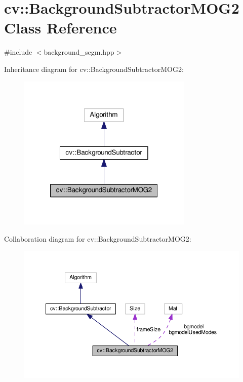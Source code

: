 \hypertarget{classcv_1_1BackgroundSubtractorMOG2}{\section{cv\-:\-:Background\-Subtractor\-M\-O\-G2 Class Reference}
\label{classcv_1_1BackgroundSubtractorMOG2}
}


{\ttfamily \#include $<$background\-\_\-segm.\-hpp$>$}



Inheritance diagram for cv\-:\-:Background\-Subtractor\-M\-O\-G2\-:\nopagebreak
\begin{figure}[H]
\begin{center}
\leavevmode
\includegraphics[width=236pt]{classcv_1_1BackgroundSubtractorMOG2__inherit__graph}
\end{center}
\end{figure}


Collaboration diagram for cv\-:\-:Background\-Subtractor\-M\-O\-G2\-:\nopagebreak
\begin{figure}[H]
\begin{center}
\leavevmode
\includegraphics[width=350pt]{classcv_1_1BackgroundSubtractorMOG2__coll__graph}
\end{center}
\end{figure}
